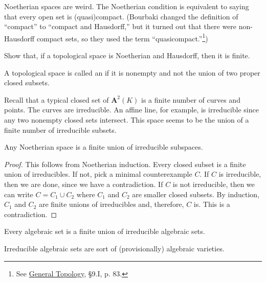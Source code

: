 \documentclass [11 pt, oneside] {article}
\begin{document}
Noetherian spaces are weird. The Noetherian condition is equivalent to saying that every open set is (quasi)compact. (Bourbaki changed the definition of ``compact'' to ``compact and Hausdorff,'' but it turned out that there were non-Hausdorff compact sets, so they used the term ``quasicompact.''\footnote{See \ul{General Topology}, \S 9.I, p. 83.}) 

\begin{exercise}\label{}
Show that, if a topological space is Noetherian and Hausdorff, then it is finite.
\end{exercise}

\begin{definition}[ ]\label{}
A topological space is called an  if it is nonempty and not the union of two proper closed subsets.
\end{definition}

Recall that a typical closed set of $\mathbf{A}^2(K)$ is a finite number of curves and points. The curves are irreducible. An affine line, for example, is irreducible since any two nonempty closed sets intersect. This space seems to be the union of a finite number of irreducible subsets.

\begin{theorem}[ ]\label{}\index{}
Any Noetherian space is a finite union of irreducible subspaces.
\end{theorem}

\begin{proof}
This follows from Noetherian induction. Every closed subset is a finite union of irreducibles. If not, pick a minimal counterexample $C$. If $C$ is irreducible, then we are done, since we have a contradiction. If $C$ is not irreducible, then we can write $C=C_1\cup C_2$ where $C_1$ and $C_2$ are smaller closed subsets. By induction, $C_1$ and $C_2$ are finite unions of irreducibles and, therefore, $C$ is. This is a contradiction. 
\end{proof}

\begin{corollary}[ ]\label{}
Every algebraic set is a finite union of irreducible algebraic sets.
\end{corollary}

\begin{remark}
	Irreducible algebraic sets are sort of (provisionally) algebraic varieties.
\end{remark}
\end{document}
